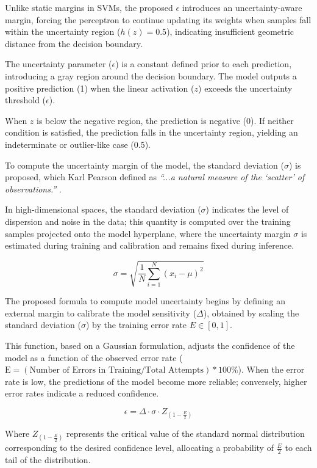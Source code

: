 \documentclass[conference]{IEEEtran}
\begin{document}
Unlike static margins in SVMs, the proposed $\epsilon$ introduces an uncertainty-aware margin, forcing the perceptron to continue updating its weights when samples fall within the uncertainty region ($h(z) = 0.5$), indicating insufficient geometric distance from the decision boundary.

The uncertainty parameter ($\epsilon$) is a constant defined prior to each prediction, introducing a gray region around the decision boundary. The model outputs a positive prediction (1) when the linear activation ($z$) exceeds the uncertainty threshold ($\epsilon$). 

When $z$ is below the negative region, the prediction is negative (0). If neither condition is satisfied, the prediction falls in the uncertainty region, yielding an indeterminate or outlier-like case (0.5).

To compute the uncertainty margin of the model, the standard deviation ($\sigma$) is proposed, which Karl Pearson defined as \textit{``...a natural measure of the `scatter' of observations.''} \cite{b10}. 

In high-dimensional spaces, the standard deviation ($\sigma$) indicates the level of dispersion and noise in the data; this quantity is computed over the training samples projected onto the model hyperplane, where the uncertainty margin $\sigma$ is estimated during training and calibration and remains fixed during inference.

\begin{equation}
\sigma = \sqrt{\frac{1}{N} \sum_{i=1}^{N} (x_i - \mu)^2}
\end{equation}

The proposed formula to compute model uncertainty begins by defining an external margin to calibrate the model sensitivity ($\Delta$), obtained by scaling the standard deviation ($\sigma$) by the training error rate $E \in [0,1]$. 

This function, based on a Gaussian formulation, adjusts the confidence of the model as a function of the observed error rate ($\text{E} = (\text{Number of Errors in Training} / \text{Total Attempts}) * 100\%$). When the error rate is low, the predictions of the model become more reliable; conversely, higher error rates indicate a reduced confidence.

\begin{equation}
\epsilon = \Delta \cdot \sigma \cdot Z_{(1 - \frac{E}{2})}
\end{equation}

Where $Z_{(1 - \frac{E}{2})}$ represents the critical value of the standard normal distribution corresponding to the desired confidence level, allocating a probability of $\frac{E}{2}$ to each tail of the distribution.
\end{document}
